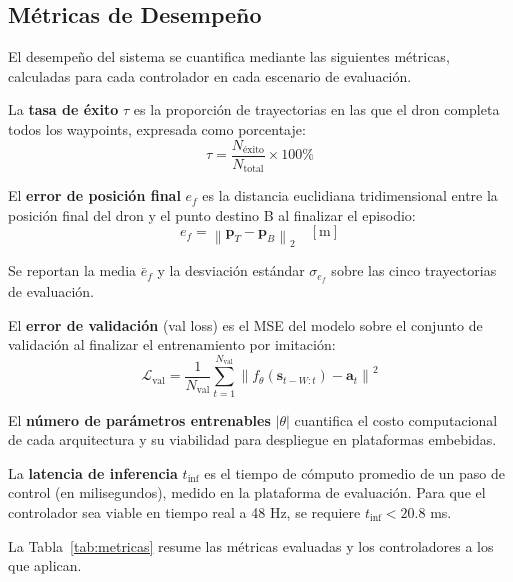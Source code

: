 \subsection{Métricas de Desempeño}

El desempeño del sistema se cuantifica mediante las siguientes métricas, calculadas para cada controlador en cada escenario de evaluación.

La \textbf{tasa de éxito} $\tau$ es la proporción de trayectorias en las que el dron completa todos los waypoints, expresada como porcentaje:
\begin{equation}
\tau = \frac{N_{\text{éxito}}}{N_{\text{total}}} \times 100\%
\end{equation}

El \textbf{error de posición final} $e_f$ es la distancia euclidiana tridimensional entre la posición final del dron y el punto destino B al finalizar el episodio:
\begin{equation}
e_f = \left\| \mathbf{p}_T - \mathbf{p}_B \right\|_2 \quad [\text{m}]
\end{equation}

\noindent Se reportan la media $\bar{e}_f$ y la desviación estándar $\sigma_{e_f}$ sobre las cinco trayectorias de evaluación.

El \textbf{error de validación} (val loss) es el MSE del modelo sobre el conjunto de validación al finalizar el entrenamiento por imitación:
\begin{equation}
\mathcal{L}_{\text{val}} = \frac{1}{N_{\text{val}}} \sum_{t=1}^{N_{\text{val}}} \left\| f_\theta(\mathbf{s}_{t-W:t}) - \mathbf{a}_t \right\|^2
\end{equation}

El \textbf{número de parámetros entrenables} $|\theta|$ cuantifica el costo computacional de cada arquitectura y su viabilidad para despliegue en plataformas embebidas.

La \textbf{latencia de inferencia} $t_{\text{inf}}$ es el tiempo de cómputo promedio de un paso de control (en milisegundos), medido en la plataforma de evaluación. Para que el controlador sea viable en tiempo real a 48 Hz, se requiere $t_{\text{inf}} < 20.8$ ms.

La Tabla~\ref{tab:metricas} resume las métricas evaluadas y los controladores a los que aplican.

